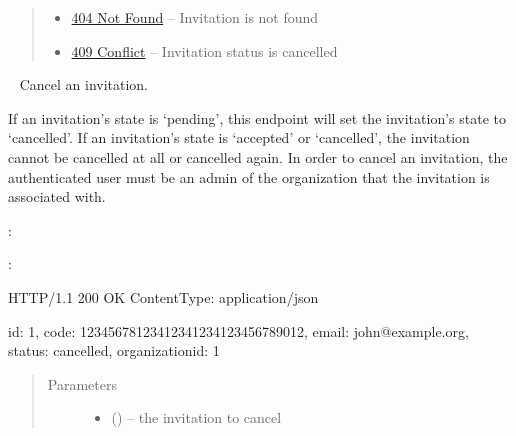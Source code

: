 \documentclass[letterpaper,10pt,english]{sphinxmanual}
\begin{document}
\begin{fulllineitems}
\begin{quote}
\begin{description}
\begin{itemize}
\item {} 
\href{http://www.w3.org/Protocols/rfc2616/rfc2616-sec10.html\#sec10.4.5}{404 Not Found} -- Invitation is not found

\item {} 
\href{http://www.w3.org/Protocols/rfc2616/rfc2616-sec10.html\#sec10.4.10}{409 Conflict} -- Invitation status is cancelled

\end{itemize}

\end{description}\end{quote}

\end{fulllineitems}



\begin{fulllineitems}
\label{\detokenize{resources/invitation:put--invitations-(invitation_id)-cancel}}~
Cancel an invitation.

If an invitation's state is `pending', this endpoint will set the
invitation's state to `cancelled'. If an invitation's state is
`accepted' or `cancelled', the invitation cannot be cancelled at all or
cancelled again. In order to cancel an invitation, the authenticated
user must be an admin of the organization that the invitation is
associated with.

:

\begin{sphinxVerbatim}[commandchars=\\\{\}]
  
 
 
\end{sphinxVerbatim}

:

\begin{sphinxVerbatim}[commandchars=\\\{\}]
HTTP/1.1 200 OK
Content\PYGZhy{}Type: application/json

\PYGZob{}
    \PYGZsq{}id\PYGZsq{}: 1,
    \PYGZsq{}code\PYGZsq{}: \PYGZsq{}12345678\PYGZhy{}1234\PYGZhy{}1234\PYGZhy{}1234\PYGZhy{}123456789012\PYGZsq{},
    \PYGZsq{}email\PYGZsq{}: \PYGZsq{}john@example.org\PYGZsq{},
    \PYGZsq{}status\PYGZsq{}: \PYGZsq{}cancelled\PYGZsq{},
    \PYGZsq{}organization\PYGZus{}id\PYGZsq{}: 1
\PYGZcb{}
\end{sphinxVerbatim}
\begin{quote}\begin{description}
\item[{Parameters}] \leavevmode\begin{itemize}
\item {} 
 () -- the invitation to cancel


\end{itemize}
\end{description}
\end{quote}
\end{fulllineitems}
\end{document}
